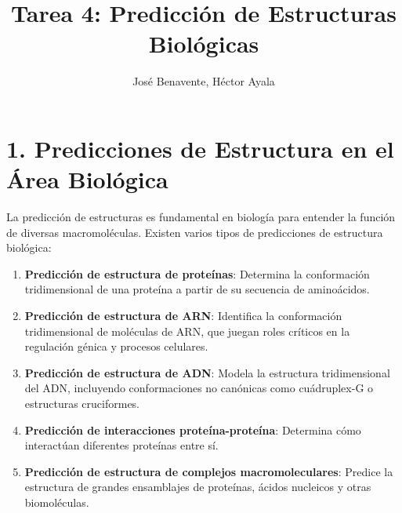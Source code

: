 \documentclass[11pt,a4paper]{article}
\title{\textbf{Tarea 4: Predicción de Estructuras Biológicas}}
\author{José Benavente, Héctor Ayala}
\date{}
\begin{document}
  
  \maketitle
  
  \section*{1. Predicciones de Estructura en el Área Biológica}
  
  \noindent La predicción de estructuras es fundamental en biología para entender la función de diversas macromoléculas. Existen varios tipos de predicciones de estructura biológica:
  
  \begin{enumerate}
    [noitemsep,topsep=0pt,leftmargin=*]
    \item \textbf{Predicción de estructura de proteínas}: Determina la conformación tridimensional de una proteína a partir de su secuencia de aminoácidos. %
    
    \item \textbf{Predicción de estructura de ARN}: Identifica la conformación tridimensional de moléculas de ARN, que juegan roles críticos en la regulación génica y procesos celulares.
    
    \item \textbf{Predicción de estructura de ADN}: Modela la estructura tridimensional del ADN, incluyendo conformaciones no canónicas como cuádruplex-G o estructuras cruciformes.
    
    \item \textbf{Predicción de interacciones proteína-proteína}: Determina cómo interactúan diferentes proteínas entre sí.%
    
    \item \textbf{Predicción de estructura de complejos macromoleculares}: Predice la estructura de grandes ensamblajes de proteínas, ácidos nucleicos y otras biomoléculas.%
  \end{enumerate}
  
  
\end{document}
